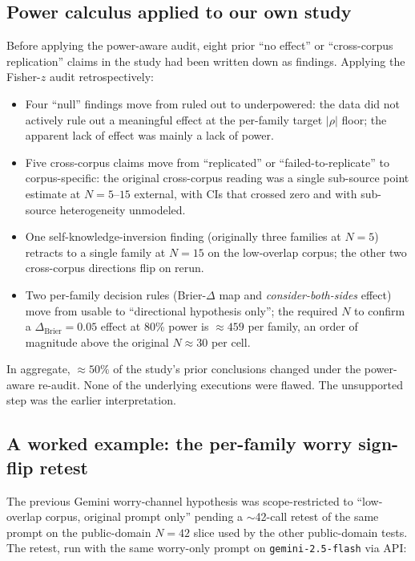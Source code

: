 \documentclass[11pt]{article}
\begin{document}
\subsection{Power calculus applied to our own study}

Before applying the power-aware audit, eight prior ``no effect'' or ``cross-corpus replication'' claims in the study had been written down as findings. Applying the Fisher-$z$ audit retrospectively:

\begin{itemize}[leftmargin=*]
\item Four ``null'' findings move from ruled out to underpowered: the data did not actively rule out a meaningful effect at the per-family target $|\rho|$ floor; the apparent lack of effect was mainly a lack of power.
\item Five cross-corpus claims move from ``replicated'' or ``failed-to-replicate'' to corpus-specific: the original cross-corpus reading was a single sub-source point estimate at $N{=}5$--$15$ external, with CIs that crossed zero and with sub-source heterogeneity unmodeled.
\item One self-knowledge-inversion finding (originally three families at $N{=}5$) retracts to a single family at $N{=}15$ on the low-overlap corpus; the other two cross-corpus directions flip on rerun.
\item Two per-family decision rules (Brier-$\Delta$ map and \emph{consider-both-sides} effect) move from usable to ``directional hypothesis only''; the required $N$ to confirm a $\Delta_{\mathrm{Brier}}{=}0.05$ effect at 80\% power is $\approx 459$ per family, an order of magnitude above the original $N{\approx}30$ per cell.
\end{itemize}

In aggregate, $\approx 50\%$ of the study's prior conclusions changed under the power-aware re-audit. None of the underlying executions were flawed. The unsupported step was the earlier interpretation.

\subsection{A worked example: the per-family worry sign-flip retest}

The previous Gemini worry-channel hypothesis was scope-restricted to ``low-overlap corpus, original prompt only'' pending a $\sim$42-call retest of the same prompt on the public-domain $N{=}42$ slice used by the other public-domain tests. The retest, run with the same worry-only prompt on \texttt{gemini-2.5-flash} via API:
\end{document}
